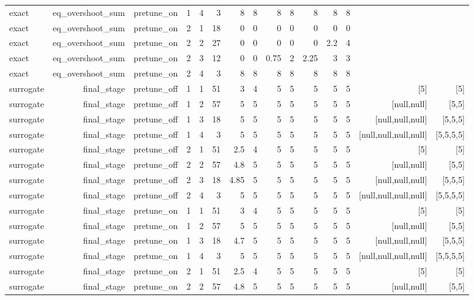 \begin{table}[htbp]
\begin{tabular}{lrrrrrrrrrrrrrr}
exact & eq\_overshoot\_sum & pretune\_on & 1 & 4 & 3 & 8 & 8 & 8 & 8 & 8 & 8 & 8 &  &  \\
exact & eq\_overshoot\_sum & pretune\_on & 2 & 1 & 18 & 0 & 0 & 0 & 0 & 0 & 0 & 0 &  &  \\
exact & eq\_overshoot\_sum & pretune\_on & 2 & 2 & 27 & 0 & 0 & 0 & 0 & 0 & 2.2 & 4 &  &  \\
exact & eq\_overshoot\_sum & pretune\_on & 2 & 3 & 12 & 0 & 0 & 0.75 & 2 & 2.25 & 3 & 3 &  &  \\
exact & eq\_overshoot\_sum & pretune\_on & 2 & 4 & 3 & 8 & 8 & 8 & 8 & 8 & 8 & 8 &  &  \\
surrogate & final\_stage & pretune\_off & 1 & 1 & 51 & 3 & 4 & 5 & 5 & 5 & 5 & 5 & [5] & [5] \\
surrogate & final\_stage & pretune\_off & 1 & 2 & 57 & 5 & 5 & 5 & 5 & 5 & 5 & 5 & [null,null] & [5,5] \\
surrogate & final\_stage & pretune\_off & 1 & 3 & 18 & 5 & 5 & 5 & 5 & 5 & 5 & 5 & [null,null,null] & [5,5,5] \\
surrogate & final\_stage & pretune\_off & 1 & 4 & 3 & 5 & 5 & 5 & 5 & 5 & 5 & 5 & [null,null,null,null] & [5,5,5,5] \\
surrogate & final\_stage & pretune\_off & 2 & 1 & 51 & 2.5 & 4 & 5 & 5 & 5 & 5 & 5 & [5] & [5] \\
surrogate & final\_stage & pretune\_off & 2 & 2 & 57 & 4.8 & 5 & 5 & 5 & 5 & 5 & 5 & [null,null] & [5,5] \\
surrogate & final\_stage & pretune\_off & 2 & 3 & 18 & 4.85 & 5 & 5 & 5 & 5 & 5 & 5 & [null,null,null] & [5,5,5] \\
surrogate & final\_stage & pretune\_off & 2 & 4 & 3 & 5 & 5 & 5 & 5 & 5 & 5 & 5 & [null,null,null,null] & [5,5,5,5] \\
surrogate & final\_stage & pretune\_on & 1 & 1 & 51 & 3 & 4 & 5 & 5 & 5 & 5 & 5 & [5] & [5] \\
surrogate & final\_stage & pretune\_on & 1 & 2 & 57 & 5 & 5 & 5 & 5 & 5 & 5 & 5 & [null,null] & [5,5] \\
surrogate & final\_stage & pretune\_on & 1 & 3 & 18 & 4.7 & 5 & 5 & 5 & 5 & 5 & 5 & [null,null,null] & [5,5,5] \\
surrogate & final\_stage & pretune\_on & 1 & 4 & 3 & 5 & 5 & 5 & 5 & 5 & 5 & 5 & [null,null,null,null] & [5,5,5,5] \\
surrogate & final\_stage & pretune\_on & 2 & 1 & 51 & 2.5 & 4 & 5 & 5 & 5 & 5 & 5 & [5] & [5] \\
surrogate & final\_stage & pretune\_on & 2 & 2 & 57 & 4.8 & 5 & 5 & 5 & 5 & 5 & 5 & [null,null] & [5,5] \\

\end{tabular}
\end{table}
